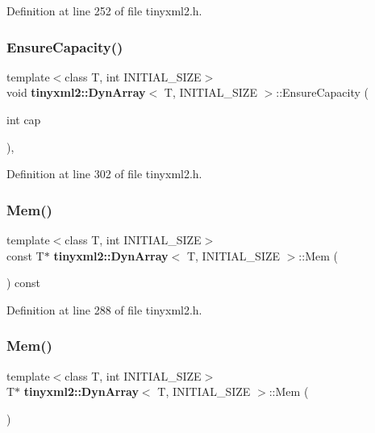 Definition at line 252 of file tinyxml2.\+h.

\mbox{\label{classtinyxml2_1_1_dyn_array_a30f2dec82744b45667452e6ce3d51e32}} 
\subsubsection{Ensure\+Capacity()}
{\footnotesize\ttfamily template$<$class T, int I\+N\+I\+T\+I\+A\+L\+\_\+\+S\+I\+ZE$>$ \\
void \textbf{ tinyxml2\+::\+Dyn\+Array}$<$ T, I\+N\+I\+T\+I\+A\+L\+\_\+\+S\+I\+ZE $>$\+::Ensure\+Capacity (\begin{DoxyParamCaption}\item[{int}]{cap }\end{DoxyParamCaption})\hspace{0.3cm}{\ttfamily [inline]}, {\ttfamily [private]}}



Definition at line 302 of file tinyxml2.\+h.

\mbox{\label{classtinyxml2_1_1_dyn_array_a60b33e61cf10b3fd900ee46692dc0fe9}} 
\subsubsection{Mem()\hspace{0.1cm}{\footnotesize\ttfamily [1/2]}}
{\footnotesize\ttfamily template$<$class T, int I\+N\+I\+T\+I\+A\+L\+\_\+\+S\+I\+ZE$>$ \\
const T$\ast$ \textbf{ tinyxml2\+::\+Dyn\+Array}$<$ T, I\+N\+I\+T\+I\+A\+L\+\_\+\+S\+I\+ZE $>$\+::Mem (\begin{DoxyParamCaption}{ }\end{DoxyParamCaption}) const\hspace{0.3cm}{\ttfamily [inline]}}



Definition at line 288 of file tinyxml2.\+h.

\mbox{\label{classtinyxml2_1_1_dyn_array_a2f0842cd666e2ad951f1a8bd6561fa40}} 
\subsubsection{Mem()\hspace{0.1cm}{\footnotesize\ttfamily [2/2]}}
{\footnotesize\ttfamily template$<$class T, int I\+N\+I\+T\+I\+A\+L\+\_\+\+S\+I\+ZE$>$ \\
T$\ast$ \textbf{ tinyxml2\+::\+Dyn\+Array}$<$ T, I\+N\+I\+T\+I\+A\+L\+\_\+\+S\+I\+ZE $>$\+::Mem (\begin{DoxyParamCaption}{ }\end{DoxyParamCaption})\hspace{0.3cm}{\ttfamily [inline]}}



